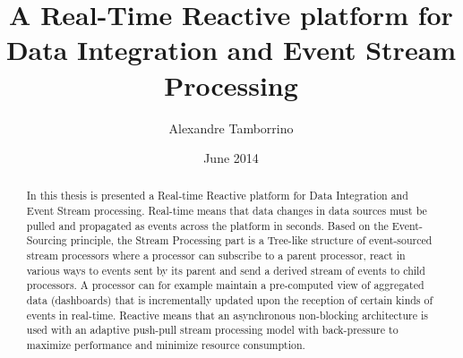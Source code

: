 \documentclass[a4paper,11pt]{kth-mag}
\title{A Real-Time Reactive platform for Data Integration and Event Stream Processing}
\author{Alexandre Tamborrino}
\date{June 2014}
\begin{document}
\frontmatter
\pagestyle{empty}
\removepagenumbers
\maketitle
{}

\begin{abstract}
In this thesis is presented a Real-time Reactive platform for Data Integration and Event Stream processing. 
Real-time means that data changes in data sources must be pulled and propagated as events across the platform in seconds. Based on the Event-Sourcing principle, the Stream Processing part is a Tree-like structure of event-sourced stream processors where a processor can subscribe to a parent processor, react in various ways to events sent by its parent and send a derived stream of events to child processors. A processor can for example maintain a pre-computed view of aggregated data (dashboards) that is incrementally updated upon the reception of certain kinds of events in real-time.
Reactive means that an asynchronous non-blocking architecture is used with an adaptive push-pull stream processing model with back-pressure to maximize performance and minimize resource consumption.
\end{abstract}
\clearpage



\tableofcontents*

\mainmatter
\pagestyle{newchap}









\newpage
\printbibliography

\newpage
\listoffigures

\newpage
\listoflistings
\end{document}
